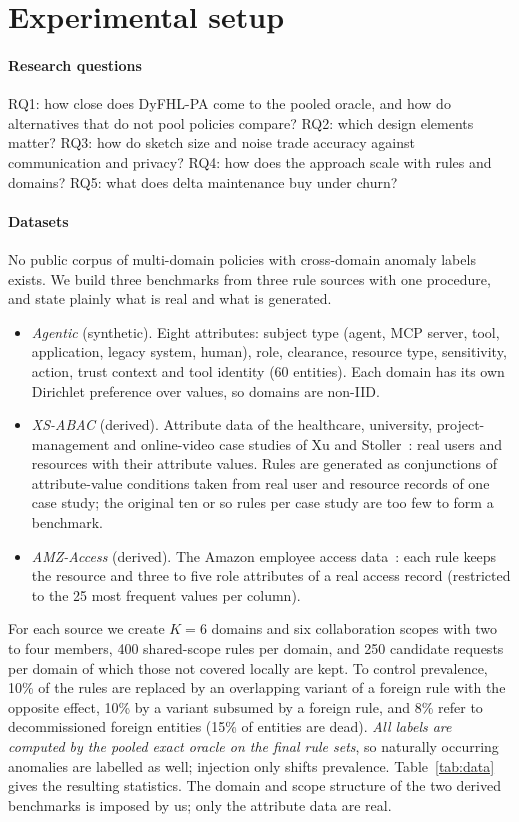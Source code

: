 \documentclass[preprint,12pt]{elsarticle}
\theoremstyle{definition}
\newcommand{\name}{DyFHL-PA\xspace}
\begin{document}
\section{Experimental setup}
\label{sec:setup}

\paragraph{Research questions} RQ1: how close does \name come to the pooled oracle, and how do alternatives that do not pool policies compare? RQ2: which design elements matter? RQ3: how do sketch size and noise trade accuracy against communication and privacy? RQ4: how does the approach scale with rules and domains? RQ5: what does delta maintenance buy under churn?

\paragraph{Datasets} No public corpus of multi-domain policies with cross-domain anomaly labels exists. We build three benchmarks from three rule sources with one procedure, and state plainly what is real and what is generated.
\begin{itemize}
\item \emph{Agentic} (synthetic). Eight attributes: subject type (agent, MCP server, tool, application, legacy system, human), role, clearance, resource type, sensitivity, action, trust context and tool identity (60 entities). Each domain has its own Dirichlet preference over values, so domains are non-IID.
\item \emph{XS-ABAC} (derived). Attribute data of the healthcare, university, project-management and online-video case studies of Xu and Stoller~\cite{xu2015mining}: real users and resources with their attribute values. Rules are generated as conjunctions of attribute-value conditions taken from real user and resource records of one case study; the original ten or so rules per case study are too few to form a benchmark.
\item \emph{AMZ-Access} (derived). The Amazon employee access data~\cite{amazon2013access}: each rule keeps the resource and three to five role attributes of a real access record (restricted to the 25 most frequent values per column).
\end{itemize}
For each source we create $K=6$ domains and six collaboration scopes with two to four members, 400 shared-scope rules per domain, and 250 candidate requests per domain of which those not covered locally are kept. To control prevalence, 10\% of the rules are replaced by an overlapping variant of a foreign rule with the opposite effect, 10\% by a variant subsumed by a foreign rule, and 8\% refer to decommissioned foreign entities (15\% of entities are dead). \emph{All labels are computed by the pooled exact oracle on the final rule sets}, so naturally occurring anomalies are labelled as well; injection only shifts prevalence. Table~\ref{tab:data} gives the resulting statistics. The domain and scope structure of the two derived benchmarks is imposed by us; only the attribute data are real.
\end{document}
